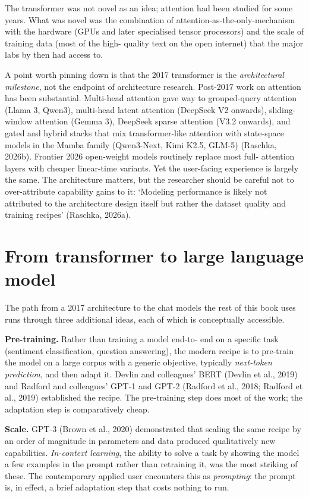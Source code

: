 \documentclass[
  letterpaper,
  11pt]{scrbook}
\begin{document}
The transformer was not novel as an idea; attention had been studied for
some years. What was novel was the combination of
attention-as-the-only-mechanism with the hardware (GPUs and later
specialised tensor processors) and the scale of training data (most of
the high- quality text on the open internet) that the major labs by then
had access to.

A point worth pinning down is that the 2017 transformer is the
\emph{architectural milestone}, not the endpoint of architecture
research. Post-2017 work on attention has been substantial. Multi-head
attention gave way to grouped-query attention (Llama 3, Qwen3),
multi-head latent attention (DeepSeek V2 onwards), sliding-window
attention (Gemma 3), DeepSeek sparse attention (V3.2 onwards), and gated
and hybrid stacks that mix transformer-like attention with state-space
models in the Mamba family (Qwen3-Next, Kimi K2.5, GLM-5) (Raschka,
2026b). Frontier 2026 open-weight models routinely replace most full-
attention layers with cheaper linear-time variants. Yet the user-facing
experience is largely the same. The architecture matters, but the
researcher should be careful not to over-attribute capability gains to
it: `Modeling performance is likely not attributed to the architecture
design itself but rather the dataset quality and training recipes'
(Raschka, 2026a).

\section{From transformer to large language
model}\label{from-transformer-to-large-language-model}

The path from a 2017 architecture to the chat models the rest of this
book uses runs through three additional ideas, each of which is
conceptually accessible.

\textbf{Pre-training.} Rather than training a model end-to- end on a
specific task (sentiment classification, question answering), the modern
recipe is to pre-train the model on a large corpus with a generic
objective, typically \emph{next-token prediction}, and then adapt it.
Devlin and colleagues' BERT (Devlin et al., 2019) and Radford and
colleagues' GPT-1 and GPT-2 (Radford et al., 2018; Radford et al., 2019)
established the recipe. The pre-training step does most of the work; the
adaptation step is comparatively cheap.

\textbf{Scale.} GPT-3 ({Brown et al.}, 2020) demonstrated that scaling
the same recipe by an order of magnitude in parameters and data produced
qualitatively new capabilities. \emph{In-context learning}, the ability
to solve a task by showing the model a few examples in the prompt rather
than retraining it, was the most striking of these. The contemporary
applied user encounters this as \emph{prompting}: the prompt is, in
effect, a brief adaptation step that costs nothing to run.
\end{document}

